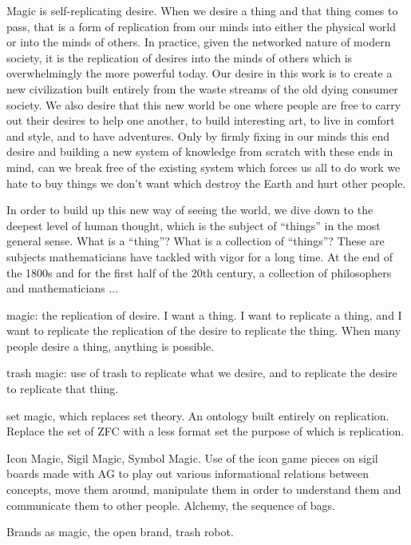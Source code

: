 
Magic is self-replicating desire.  When we desire a thing and that thing comes to pass, that is a form of replication from our minds into either the physical world or into the minds of others.  In practice, given the networked nature of modern society, it is the replication of desires into the minds of others which is overwhelmingly the more powerful today.  Our desire in this work is to create a new civilization built entirely from the waste streams of the old dying consumer society.  We also desire that this new world be one where people are free to carry out their desires to help one another, to build interesting art, to live in comfort and style, and to have adventures.  Only by firmly fixing in our minds this end desire and building a new system of knowledge from scratch with these ends in mind, can we break free of the existing system which forces us all to do work we hate to buy things we don't want which destroy the Earth and hurt other people. 

In order to build up this new way of seeing the world, we dive down to the deepest level of human thought, which is the subject of ``things'' in the most general sense.  What is a ``thing''? What is a collection of ``things''?  These are subjects mathematicians have tackled with vigor for a long time.  At the end of the 1800s and for the first half of the 20th century,  a collection of philosophers and mathematicians ...

magic: the replication of desire.  I want a thing.  I want to replicate a thing, and I want to replicate the replication of the desire to replicate the thing.  When many people desire a thing, anything is possible.  

trash magic: use of trash to replicate what we desire, and to replicate the desire to replicate that thing.

set magic, which replaces set theory.  An ontology built entirely on replication.  Replace the set of ZFC with a less format set the purpose of which is replication.

Icon Magic, Sigil Magic, Symbol Magic.  Use of the icon game pieces on sigil boards made with AG to play out various informational relations between concepts, move them around, manipulate them in order to understand them and communicate them to other people. Alchemy, the sequence of bags.

Brands as magic, the open brand, trash robot.  

